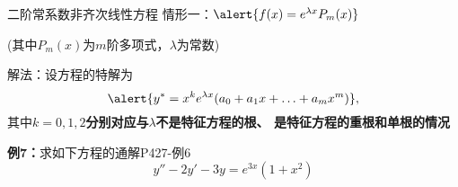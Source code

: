 \begin{frame}{二阶常系数非齐次线性方程}
	\linespread{1.2}\pause 
	{\bb 情形一：}$\alert{f(x)=e^{\lambda x}P_m(x)}$\pause 
	
	\hspace{4em}(其中$P_m(x)$为$m$阶多项式，$\lambda$为常数)\pause 
	
	{\bb 解法：}设方程的特解为
	$$\alert{y^*=x^ke^{\lambda x}(a_0+a_1x+\ldots+a_mx^m)},$$
	\pause 其中\alert{\bf $k=0,1,2$分别对应与$\lambda$不是特征方程的根、
	是特征方程的重根和单根的情况}\pause 
	\begin{exampleblock}{{\bf 例7：}求如下方程的通解\hfill P427-例6}
		$$y''-2y'-3y=e^{3x}(1+x^2)$$
	\end{exampleblock}
\end{frame}

% 
% 

